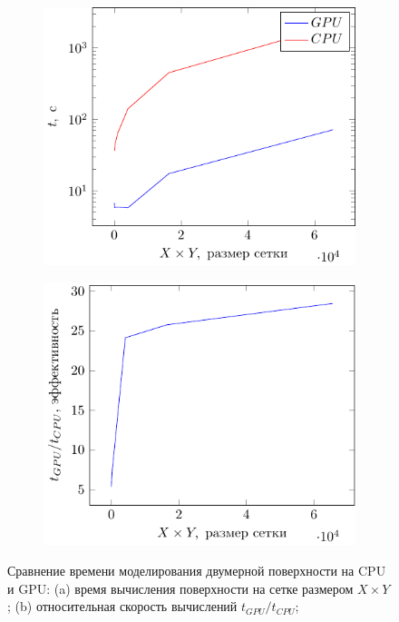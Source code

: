 \begin{figure}[ht]
    \centering
    \begin{subfigure}{0.49\linewidth}
        \centering
        \includegraphics[]{fig/water/gpucpu.pdf}
    \end{subfigure}
    \begin{subfigure}{0.49\linewidth}
        \centering
        \includegraphics[]{fig/water/gpucpu1.pdf}
    \end{subfigure}
    \caption{Сравнение времени моделирования двумерной поверхности на CPU и
    GPU: (a) время вычисления поверхности на сетке размером $X \times Y$;
(b) относительная скорость вычислений $t_{GPU}/t_{CPU}$;}
    \label{fig:gpucpu}
\end{figure}

